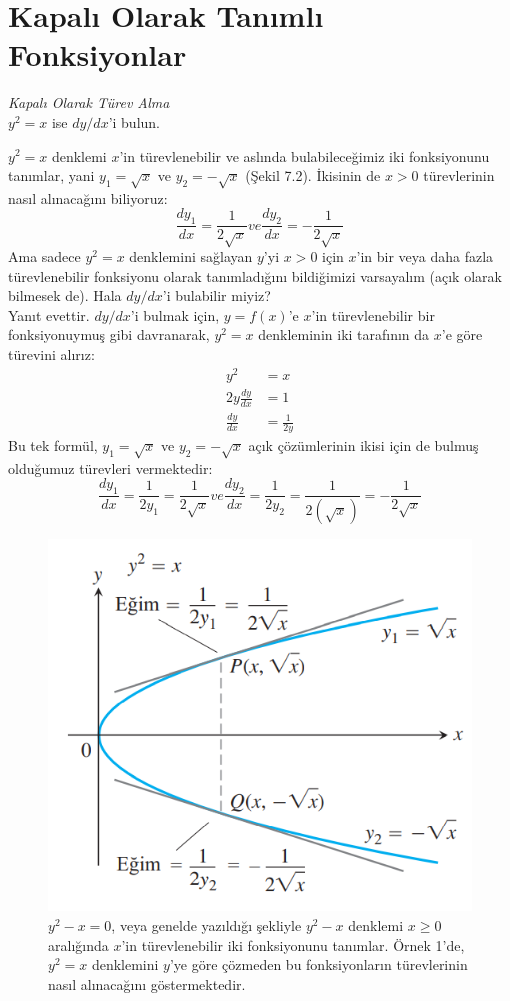 \section{\protect Kapalı Olarak Tanımlı Fonksiyonlar}
\begin{ornek}\textit{Kapalı Olarak Türev Alma}\\
	$y^2=x$ ise $dy/dx$'i bulun.
\end{ornek}
\begin{cozum}
	$y^2=x$ denklemi $x$'in türevlenebilir ve aslında bulabileceğimiz iki fonksiyonunu tanımlar, yani $y_1=\sqrt{x}$ ve $y_2=-\sqrt{x}$ (Şekil 7.2). İkisinin de $x>0$ türevlerinin nasıl alınacağını biliyoruz:
	\begin{equation*}
	\frac{dy_1}{dx}=\frac{1}{2\sqrt{x}} \textit{ve} \frac{dy_2}{dx}=-\frac{1}{2\sqrt{x}}
	\end{equation*}
Ama sadece $y^2=x$ denklemini sağlayan $y$'yi $x>0$ için $x$'in bir veya daha fazla türevlenebilir fonksiyonu olarak tanımladığını bildiğimizi varsayalım (açık olarak bilmesek de). Hala $dy/dx$'i bulabilir miyiz?\\
Yanıt evettir. $dy/dx$'i bulmak için, $y=f(x)$'e $x$'in türevlenebilir bir fonksiyonuymuş gibi davranarak, $y^2=x$ denkleminin iki tarafının da $x$'e göre türevini alırız:
	\begin{equation*}
	\begin{split}
	y^2&=x\\
	2y	\frac{dy}{dx}&=1\\
	\frac{dy}{dx}&=\frac{1}{2y}
	\end{split}
	\end{equation*}
Bu tek formül, $y_1=\sqrt{x}$ ve $y_2=-\sqrt{x}$ açık çözümlerinin ikisi için de bulmuş olduğumuz türevleri vermektedir:
	\begin{equation*}
	\frac{dy_1}{dx}=\frac{1}{2y_1}=\frac{1}{2\sqrt{x}} \textit{ve} \frac{dy_2}{dx}=\frac{1}{2y_2}=\frac{1}{2(\sqrt{x})}=-\frac{1}{2\sqrt{x}}
	\end{equation*}
\end{cozum}
\begin{figure}[H]
	\centering
	\includegraphics[width=0.5\linewidth]{kapaliturev2.png}
	\caption{$y^2-x=0$, veya genelde yazıldığı şekliyle $y^2-x$ denklemi $x \geq 0$ aralığında $x$'in türevlenebilir iki fonksiyonunu tanımlar. Örnek 1'de, $y^2=x$ denklemini $y$'ye göre çözmeden bu fonksiyonların türevlerinin nasıl alınacağını göstermektedir.}
	\label{fig:ornekresim}
\end{figure}
